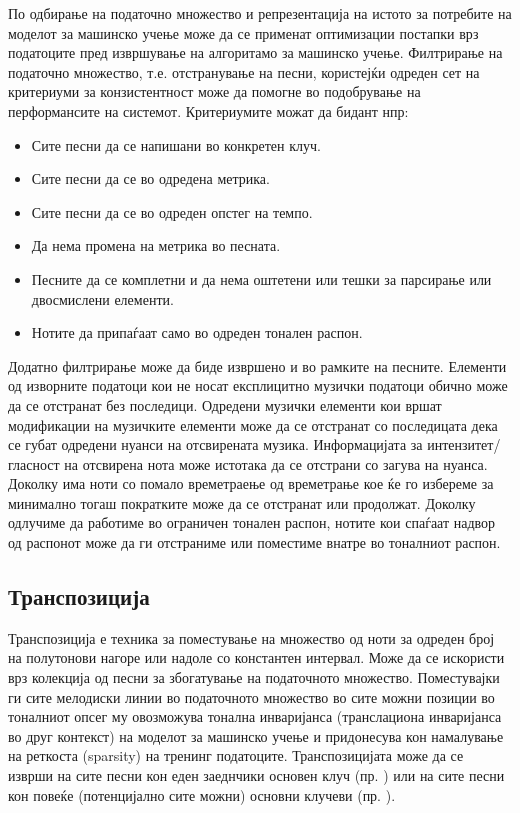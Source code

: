 По одбирање на податочно множество и репрезентација на истото за потребите на моделот за машинско учење може да се применат оптимизации постапки врз податоците пред извршување на алгоритамо за машинско учење.
Филтрирање на податочно множество, т.е. отстранување на песни, користејќи одреден сет на критериуми за конзистентност може да помогне во подобрување на перформансите на системот. Критериумите можат да бидант нпр:
\begin{itemize}
    \item Сите песни да се напишани во конкретен клуч.
    \item Сите песни да се во одредена метрика.
    \item Сите песни да се во одреден опстег на темпо.
    \item Да нема промена на метрика во песната.
    \item Песните да се комплетни и да нема оштетени или тешки за парсирање или двосмислени елементи.
    \item Нотите да припаѓаат само во одреден тонален распон.
\end{itemize}
Додатно филтрирање може да биде извршено и во рамките на песните. Елементи од изворните податоци кои не носат експлицитно музички податоци обично може да се отстранат без последици. Одредени музички елементи кои вршат модификации на музичките елементи може да се отстранат со последицата дека се губат одредени нуанси на отсвирената музика. Информацијата за интензитет/гласност на отсвирена нота може истотака да се отстрани со загува на нуанса. Доколку има ноти со помало времетраење од времетрање кое ќе го избереме за минимално тогаш пократките може да се отстранат или продолжат. Доколку одлучиме да работиме во ограничен тонален распон, нотите кои спаѓаат надвор од распонот може да ги отстраниме или поместиме внатре во тоналниот распон.

\subsection{Транспозиција}

Транспозиција е техника за поместување на множество од ноти за одреден број на полутонови нагоре или надоле со константен интервал. Може да се искористи врз колекција од песни за збогатување на податочното множество. Поместувајки ги сите мелодиски линии во податочното множество во сите можни позиции во тоналниот опсег му овозможува тонална инваријанса (транслациона инваријанса во друг контекст) на моделот за машинско учење и придонесува кон намалување на реткоста (sparsity) на тренинг податоците. Транспозицијата може да се изврши на сите песни кон еден заеднчики основен клуч (пр. \cite{Sturm2016,Tikhonov2017}) или на сите песни кон повеќе (потенцијално сите можни) основни клучеви (пр. \cite{Yang2017,Bretan2016}).

